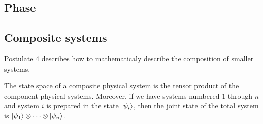 \documentclass{article}
\begin{document}
\subsection{Phase}
\subsection{Composite systems}

Postulate 4 describes how to mathematicaly describe the composition of smaller systems.
\begin{postulate}
  The state space of a composite physical system is the tensor product of the component physical systems. Moreover, if we have systems numbered $1$ through $n$ and system $i$ is prepared in the state $\ket{\psi_i}$, then the joint state of the total system is $\ket{\psi_1}\otimes\cdots\otimes\ket{\psi_n}$.
\end{postulate}
\end{document}
